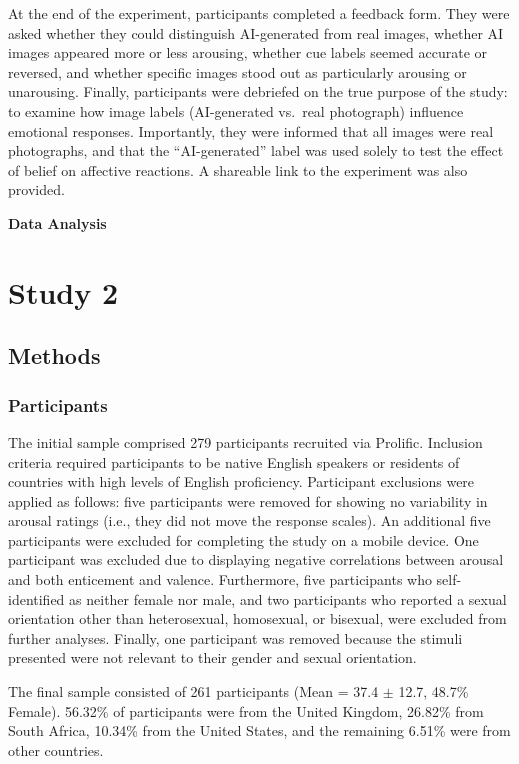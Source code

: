 \documentclass[
  jou,
  floatsintext,
  longtable,
  nolmodern,
  notxfonts,
  notimes,
  colorlinks=true,linkcolor=blue,citecolor=blue,urlcolor=blue]{apa7}
\begin{document}
At the end of the experiment, participants completed a feedback form.
They were asked whether they could distinguish AI-generated from real
images, whether AI images appeared more or less arousing, whether cue
labels seemed accurate or reversed, and whether specific images stood
out as particularly arousing or unarousing. Finally, participants were
debriefed on the true purpose of the study: to examine how image labels
(AI-generated vs.~real photograph) influence emotional responses.
Importantly, they were informed that all images were real photographs,
and that the ``AI-generated'' label was used solely to test the effect
of belief on affective reactions. A shareable link to the experiment was
also provided.

\textbf{Data Analysis}

\section{Study 2}\label{study-2}

\subsection{Methods}\label{methods-1}

\subsubsection{Participants}\label{participants}

The initial sample comprised 279 participants recruited via
Prolific\textcopyright. Inclusion criteria required participants to be
native English speakers or residents of countries with high levels of
English proficiency. Participant exclusions were applied as follows:
five participants were removed for showing no variability in arousal
ratings (i.e., they did not move the response scales). An additional
five participants were excluded for completing the study on a mobile
device. One participant was excluded due to displaying negative
correlations between arousal and both enticement and valence.
Furthermore, five participants who self-identified as neither female nor
male, and two participants who reported a sexual orientation other than
heterosexual, homosexual, or bisexual, were excluded from further
analyses. Finally, one participant was removed because the stimuli
presented were not relevant to their gender and sexual orientation.

The final sample consisted of 261 participants (Mean = 37.4 \(\pm\)
12.7, 48.7\% Female). 56.32\% of participants were from the United
Kingdom, 26.82\% from South Africa, 10.34\% from the United States, and
the remaining 6.51\% were from other countries.
\end{document}
